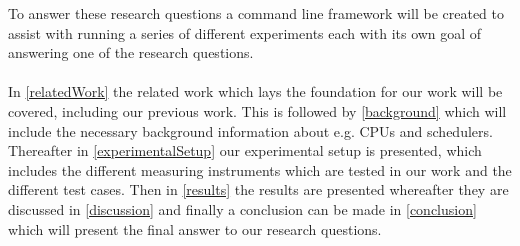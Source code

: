 To answer these research questions a command line framework will be created to assist with running a series of different experiments each with its own goal of answering one of the research questions. 

\paragraph{}
In \cref{relatedWork} the related work which lays the foundation for our work will be covered, including our previous work. This is followed by \cref{background} which will include the necessary background information about e.g. CPUs and schedulers. Thereafter in \cref{experimentalSetup} our experimental setup is presented, which includes the different measuring instruments which are tested in our work and the different test cases. %
Then in \cref{results} the results are presented whereafter they are discussed in \cref{discussion} and finally a conclusion can be made in \cref{conclusion} which will present the final answer to our research questions. 


